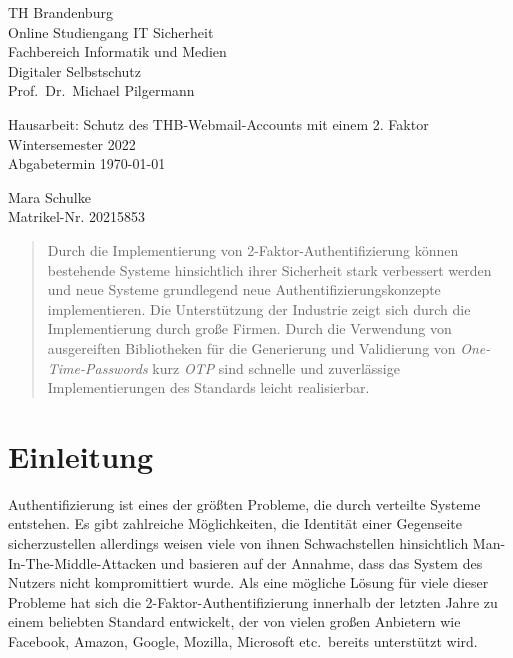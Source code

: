 \documentclass{article}
\begin{document}
\begin{titlepage}
	\begin{flushleft}
		TH Brandenburg \\
		Online Studiengang IT Sicherheit \\
		Fachbereich Informatik und Medien \\
		Digitaler Selbstschutz \\
		Prof.\ Dr.\ Michael Pilgermann
	\end{flushleft}

	\vfill

	\begin{center}
		\Large{Hausarbeit: Schutz des THB-Webmail-Accounts mit einem 2. Faktor}\\[0.5em]
		\large{Wintersemester 2022}\\[0.25em]
		\large{Abgabetermin \today}
	\end{center}

	\vfill

	\begin{flushright}
		Mara Schulke \\
		Matrikel-Nr. 20215853
	\end{flushright}
\end{titlepage}

\begin{abstract}
	Durch die Implementierung von 2-Faktor-Authentifizierung können bestehende
	Systeme hinsichtlich ihrer Sicherheit stark verbessert werden und neue
	Systeme grundlegend neue Authentifizierungskonzepte implementieren. Die
	Unterstützung der Industrie zeigt sich durch die Implementierung durch große
	Firmen. Durch die Verwendung von ausgereiften
	Bibliotheken für die Generierung und Validierung von
	\textit{One-Time-Passwords} kurz \textit{OTP} sind schnelle und
	zuverlässige Implementierungen des Standards leicht realisierbar.
\end{abstract}

\tableofcontents

\listoffigures

\newpage

\section{Einleitung}

Authentifizierung ist eines der größten Probleme, die durch verteilte Systeme
entstehen. Es gibt zahlreiche Möglichkeiten, die Identität einer Gegenseite
sicherzustellen allerdings weisen viele von ihnen Schwachstellen hinsichtlich
Man-In-The-Middle-Attacken und basieren auf der Annahme, dass das System des
Nutzers nicht kompromittiert wurde. Als eine mögliche Lösung für viele dieser
Probleme hat sich die 2-Faktor-Authentifizierung innerhalb der letzten Jahre zu
einem beliebten Standard entwickelt, der von vielen großen Anbietern wie
Facebook, Amazon, Google, Mozilla, Microsoft etc.\ bereits unterstützt
wird.
\end{document}
